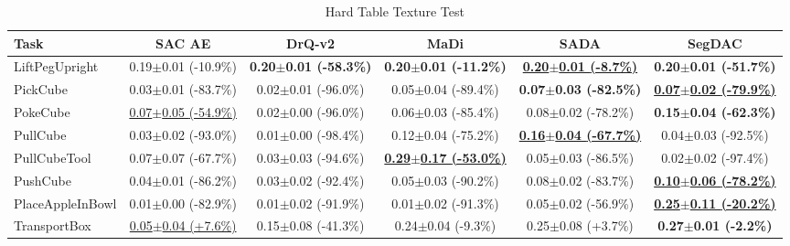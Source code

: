 \begin{table}[htbp]
\centering
\scriptsize
\caption{Hard Table Texture Test}
\label{tab:appendix_tabletexturetest_hard}
\begin{adjustbox}{max width=\textwidth}
\begin{tabular}{l*{5}{c}}
\toprule
\textbf{Task} & \textbf{SAC AE} & \textbf{DrQ-v2} & \textbf{MaDi} & \textbf{SADA} & \textbf{SegDAC} \\
\midrule
LiftPegUpright & 0.19$\pm$0.01 \scriptsize{(-10.9\%)} & \textbf{0.20$\pm$0.01 \scriptsize{(-58.3\%)}} & \textbf{0.20$\pm$0.01 \scriptsize{(-11.2\%)}} & \textbf{\underline{0.20$\pm$0.01 \scriptsize{(-8.7\%)}}} & \textbf{0.20$\pm$0.01 \scriptsize{(-51.7\%)}} \\
PickCube & 0.03$\pm$0.01 \scriptsize{(-83.7\%)} & 0.02$\pm$0.01 \scriptsize{(-96.0\%)} & 0.05$\pm$0.04 \scriptsize{(-89.4\%)} & \textbf{0.07$\pm$0.03 \scriptsize{(-82.5\%)}} & \textbf{\underline{0.07$\pm$0.02 \scriptsize{(-79.9\%)}}} \\
PokeCube & \underline{0.07$\pm$0.05 \scriptsize{(-54.9\%)}} & 0.02$\pm$0.00 \scriptsize{(-96.0\%)} & 0.06$\pm$0.03 \scriptsize{(-85.4\%)} & 0.08$\pm$0.02 \scriptsize{(-78.2\%)} & \textbf{0.15$\pm$0.04 \scriptsize{(-62.3\%)}} \\
PullCube & 0.03$\pm$0.02 \scriptsize{(-93.0\%)} & 0.01$\pm$0.00 \scriptsize{(-98.4\%)} & 0.12$\pm$0.04 \scriptsize{(-75.2\%)} & \textbf{\underline{0.16$\pm$0.04 \scriptsize{(-67.7\%)}}} & 0.04$\pm$0.03 \scriptsize{(-92.5\%)} \\
PullCubeTool & 0.07$\pm$0.07 \scriptsize{(-67.7\%)} & 0.03$\pm$0.03 \scriptsize{(-94.6\%)} & \textbf{\underline{0.29$\pm$0.17 \scriptsize{(-53.0\%)}}} & 0.05$\pm$0.03 \scriptsize{(-86.5\%)} & 0.02$\pm$0.02 \scriptsize{(-97.4\%)} \\
PushCube & 0.04$\pm$0.01 \scriptsize{(-86.2\%)} & 0.03$\pm$0.02 \scriptsize{(-92.4\%)} & 0.05$\pm$0.03 \scriptsize{(-90.2\%)} & 0.08$\pm$0.02 \scriptsize{(-83.7\%)} & \textbf{\underline{0.10$\pm$0.06 \scriptsize{(-78.2\%)}}} \\
PlaceAppleInBowl & 0.01$\pm$0.00 \scriptsize{(-82.9\%)} & 0.01$\pm$0.02 \scriptsize{(-91.9\%)} & 0.01$\pm$0.02 \scriptsize{(-91.3\%)} & 0.05$\pm$0.02 \scriptsize{(-56.9\%)} & \textbf{\underline{0.25$\pm$0.11 \scriptsize{(-20.2\%)}}} \\
TransportBox & \underline{0.05$\pm$0.04 \scriptsize{(+7.6\%)}} & 0.15$\pm$0.08 \scriptsize{(-41.3\%)} & 0.24$\pm$0.04 \scriptsize{(-9.3\%)} & 0.25$\pm$0.08 \scriptsize{(+3.7\%)} & \textbf{0.27$\pm$0.01 \scriptsize{(-2.2\%)}} \\
\bottomrule
\end{tabular}
\end{adjustbox}
\end{table}

